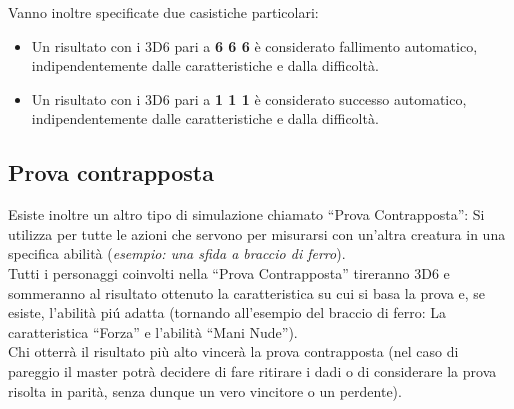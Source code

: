 \documentclass[../manuale_main.tex]{subfiles}
\begin{document}
Vanno inoltre specificate due casistiche particolari:
\begin{itemize}
\item Un risultato con i 3D6 pari a \textbf{6 6 6} è considerato fallimento automatico, indipendentemente dalle caratteristiche e dalla difficoltà.
\item Un risultato con i 3D6 pari a \textbf{1 1 1} è considerato successo automatico, indipendentemente dalle caratteristiche e dalla difficoltà.
\end{itemize}

\subsection{Prova contrapposta}
Esiste inoltre un altro tipo di simulazione chiamato ``Prova Contrapposta”:
Si utilizza per tutte le azioni che servono per misurarsi con un'altra creatura in una specifica abilità (\textit{esempio: una sfida a braccio di ferro}).\\
Tutti i personaggi coinvolti nella “Prova Contrapposta” tireranno 3D6 e sommeranno al risultato ottenuto la caratteristica su cui si basa la prova e, se esiste, l'abilità piú adatta (tornando all'esempio del braccio di ferro: La caratteristica ``Forza'' e l’abilità ``Mani Nude'').\\
Chi otterrà il risultato più alto vincerà la prova contrapposta (nel caso di pareggio il master potrà decidere di fare ritirare i dadi o di considerare la prova risolta in parità, senza dunque un vero vincitore o un perdente).
\end{document}
